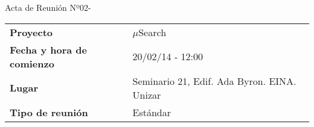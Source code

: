 \begin{center}	
\Large{Acta de Reunión Nº02\hspace{0.25em}-\hspace{0.25em}\tituloReunion}
\end{center}
\vspace{1.5em}

\begin{longtable}{ | L{\tabcolsep} |
				     L{\tabcolsep} | }
\hline %
  \\
\hline %
{\bf Proyecto} & $\mu$Search \\ 
\hline %
{\bf Fecha y hora de comienzo} & 20/02/14 - 12:00 \\
\hline %
{\bf Lugar} & Seminario 21, Edif. Ada Byron. EINA. Unizar \\
\hline %
{\bf Tipo de reunión} & Estándar \\
\hline %
\end{longtable}


